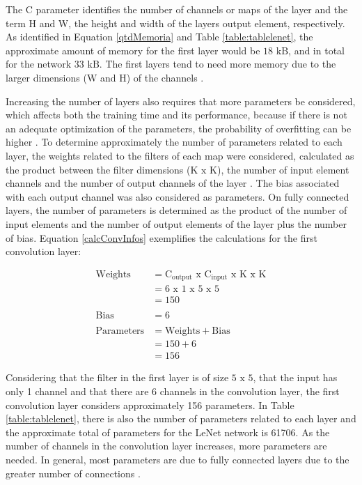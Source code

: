The C parameter identifies the number of channels or maps of the layer and the term H and W, the height and width of the layers output element, respectively. As identified in Equation \ref{qtdMemoria} and Table \ref{table:tablelenet}, the approximate amount of memory for the first layer would be $18 \text{ kB}$, and in total for the network $33 \text{ kB}$. The first layers tend to need more memory due to the larger dimensions (W and H) of the channels \cite{johnson2019}.

Increasing the number of layers also requires that more parameters be considered, which affects both the training time and its performance, because if there is not an adequate optimization of the parameters, the probability of overfitting can be higher \cite{elgendy2020}. To determine approximately the number of parameters related to each layer, the weights related to the filters of each map were considered, calculated as the product between the filter dimensions ($\text{K x K}$), the number of input element channels and the number of output channels of the layer \cite{johnson2019}. The bias associated with each output channel was also considered as parameters. On fully connected layers, the number of parameters is determined as the product of the number of input elements and the number of output elements of the layer plus the number of bias. Equation \ref{calcConvInfos} exemplifies the calculations for the first convolution layer:

\begin{equation}
\begin{split}
  \text{Weights} &= \text{C}_\text{output} \text{ x } \text{C}_\text{input} \text{ x } \text{K} \text{ x } \text{K}\\ 
  &= 6\text{ x }1 \text{ x } 5 \text{ x } 5\\
  &= 150\\\\
  \text{Bias} &= 6\\\\
  \text{Parameters} &= \text{Weights} + \text{Bias}\\
  &= 150 + 6\\
  &= 156
\end{split}
\label{calcConvInfos}
\end{equation}

Considering that the filter in the first layer is of size $5\text{ x }5$, that the input has only 1 channel and that there are 6 channels in the convolution layer, the first convolution layer considers approximately 156 parameters. In Table \ref{table:tablelenet}, there is also the number of parameters related to each layer and the approximate total of parameters for the LeNet network is 61706. As the number of channels in the convolution layer increases, more parameters are needed. In general, most parameters are due to fully connected layers due to the greater number of connections \cite{johnson2019}.

